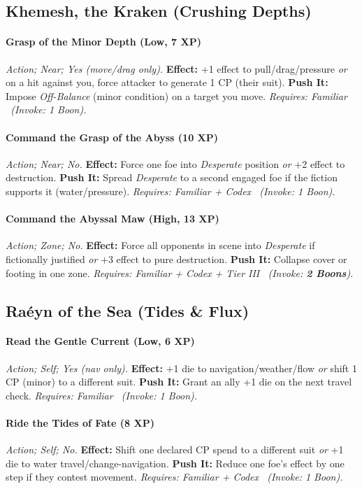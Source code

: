 \documentclass[12pt,twoside]{book}
\begin{document}
\subsection{Khemesh, the Kraken (Crushing Depths)}
\paragraph{Grasp of the Minor Depth (Low, 7 XP)} \emph{Action; Near; Yes (move/drag only).}
\textbf{Effect:} +1 effect to pull/drag/pressure \emph{or} on a hit against you, force attacker to generate 1 CP (their suit).
\textbf{Push It:} Impose \emph{Off-Balance} (minor condition) on a target you move.
\emph{Requires: Familiar \ (\textit{Invoke:} 1 Boon).}
\paragraph{Command the Grasp of the Abyss (10 XP)} \emph{Action; Near; No.}
\textbf{Effect:} Force one foe into \emph{Desperate} position \emph{or} +2 effect to destruction.
\textbf{Push It:} Spread \emph{Desperate} to a second engaged foe if the fiction supports it (water/pressure).
\emph{Requires: Familiar + Codex \ (\textit{Invoke:} 1 Boon).}
\paragraph{Command the Abyssal Maw (High, 13 XP)} \emph{Action; Zone; No.}
\textbf{Effect:} Force all opponents in scene into \emph{Desperate} if fictionally justified \emph{or} +3 effect to pure destruction.
\textbf{Push It:} Collapse cover or footing in one zone.
\emph{Requires: Familiar + Codex + Tier III \ (\textit{Invoke:} \textbf{2 Boons}).}

\subsection{Raéyn of the Sea (Tides \& Flux)}
\paragraph{Read the Gentle Current (Low, 6 XP)} \emph{Action; Self; Yes (nav only).}
\textbf{Effect:} +1 die to navigation/weather/flow \emph{or} shift 1 CP (minor) to a different suit.
\textbf{Push It:} Grant an ally +1 die on the next travel check.
\emph{Requires: Familiar \ (\textit{Invoke:} 1 Boon).}
\paragraph{Ride the Tides of Fate (8 XP)} \emph{Action; Self; No.}
\textbf{Effect:} Shift one declared CP spend to a different suit \emph{or} +1 die to water travel/change-navigation.
\textbf{Push It:} Reduce one foe’s effect by one step if they contest movement.
\emph{Requires: Familiar + Codex \ (\textit{Invoke:} 1 Boon).}
\end{document}
